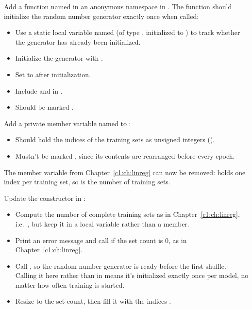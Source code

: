 \label{c2:ex:2}
Add a function named  in an anonymous namespace in
. The function should initialize the random number generator
exactly once when called:
\begin{itemize}
  \item Use a static local variable named  (of type , initialized to
    ) to track whether the generator has already been initialized.
  \item Initialize the generator with .
  \item Set  to  after initialization.
  \item Include  and  in .
  \item Should be marked .
\end{itemize}

\label{c2:ex:3}
Add a private member variable named  to :
\begin{itemize}
  \item Should hold the indices of the training sets as unsigned integers ().
  \item Mustn't be marked , since its contents are rearranged before every epoch.
\end{itemize}
The member variable  from Chapter~\ref{c1:ch:linreg} can now be removed:
 holds one index per training set, so  is the number of
training sets.

Update the constructor in :
\begin{itemize}
  \item Compute the number of complete training sets as in Chapter~\ref{c1:ch:linreg}, i.e.\
    , but keep it in a local variable rather than a
    member.
  \item Print an error message and call  if the set count is 0, as in
    Chapter~\ref{c1:ch:linreg}.
  \item Call , so the random number generator is ready before the first
    shuffle. Calling it here rather than in \code{train()} means it's initialized exactly once per
    model, no matter how often training is started.
  \item Resize  to the set count, then fill it with the indices
    \code{0, 1, 2 ... N-1}.
\end{itemize}


